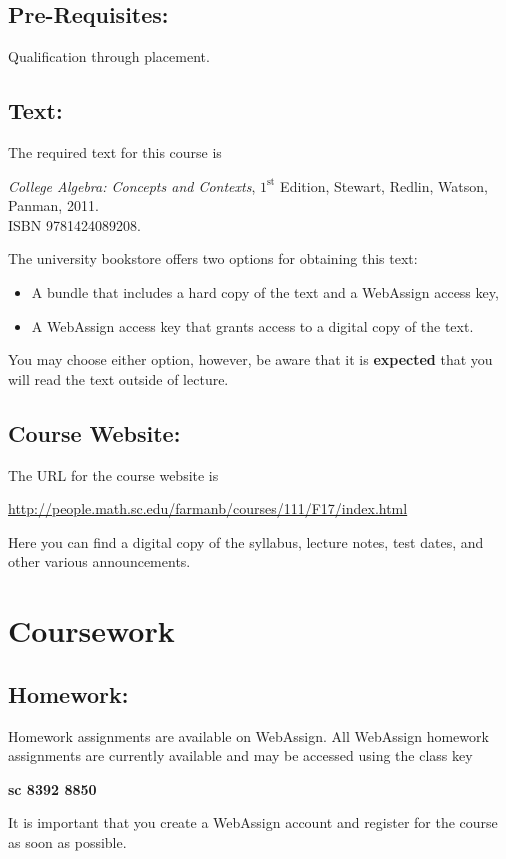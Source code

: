 \documentclass[10pt]{amsart}
\begin{document}
\subsection*{Pre-Requisites:} Qualification through placement.
\subsection*{Text:}
The required text for this course is\\
\begin{center}
  {\it College Algebra: Concepts and Contexts}, $1^{\text{st}}$ Edition, Stewart, Redlin, Watson, Panman, 2011.  \\ISBN 9781424089208.
\end{center}

\noindent
The university bookstore offers two options for obtaining this text:
\begin{itemize}
\item
  A bundle that includes a hard copy of the text and a WebAssign access key,
\item
  A WebAssign access key that grants access to a digital copy of the text.
\end{itemize}
You may choose either option, however, be aware that it is {\bf expected} that you will read the text outside of lecture.

\subsection*{Course Website:} The URL for the course website is
\begin{center}
  \url{http://people.math.sc.edu/farmanb/courses/111/F17/index.html}
\end{center}
Here you can find a digital copy of the syllabus, lecture notes, test dates, and other various announcements.

\newpage

\section*{Coursework}
\noindent
\subsection*{Homework:}
Homework assignments are available on WebAssign.
All WebAssign homework assignments are currently available and may be accessed using the class key
\begin{center}
  {\bf sc 8392 8850}
\end{center}
It is important that you create a WebAssign account and register for the course as soon as possible.
\end{document}
